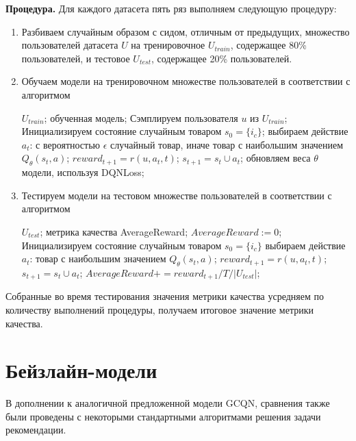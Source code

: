 \documentclass[a4paper,14pt,oneside]{mipt-thesis-ms}
\begin{document}
{\bf Процедура.} Для каждого датасета пять ряз выполняем следующую процедуру:
\begin{enumerate}
\item Разбиваем случайным образом с сидом, отличным от предыдущих, множество пользователей датасета $U$ на тренировочное $U_{train}$, содержащее 80\% пользователей, и тестовое $U_{test}$, содержащее 20\% пользователей.
\item Обучаем модели на тренировочном множестве пользователей в соответствии с алгоритмом
\begin{algorithmic}[1]
\REQUIRE $U_{train}$;
\ENSURE обученная модель;
    \STATE Сэмплируем пользователя $u$ из $U_{train}$;
    \STATE Инициализируем состояние случайным товаром $s_0 = \{i_c\}$;
        \STATE выбираем действие $a_t$: с вероятностью $\epsilon$ случайный товар, иначе товар с наибольшим значением $Q_{\theta}(s_t, a)$;
        \STATE ${reward}_{t+1} = r(u, a_t, t)$;
        \STATE $s_{t+1} = s_t \cup {a_t}$;
        \STATE обновляем веса $\theta$ модели, используя DQNLoss;
    \ENDFOR
\ENDFOR
\end{algorithmic}

\item Тестируем модели на тестовом множестве пользователей в соответствии с алгоритмом
\begin{algorithmic}[1]
\REQUIRE $U_{test}$;
\ENSURE метрика качества AverageReward;
\STATE $AverageReward := 0$;
    \STATE Инициализируем состояние случайным товаром $s_0 = \{i_c\}$
        \STATE выбираем действие $a_t$: товар с наибольшим значением $Q_{\theta}(s_t, a)$;
        \STATE ${reward}_{t+1} = r(u, a_t, t)$;
        \STATE $s_{t+1} = s_t \cup {a_t}$;
        \STATE $AverageReward += reward_{t+1} / T / |U_{test}|$;
    \ENDFOR
\ENDFOR
\end{algorithmic}

\end{enumerate}

Собранные во время тестирования значения метрики качества усредняем по количеству выполнений процедуры, получаем итоговое значение метрики качества.

\section{Бейзлайн-модели}

В дополнении к аналогичной предложенной модели GCQN, сравнения также были проведены с некоторыми стандартными алгоритмами решения задачи рекомендации.\\
\end{document}
